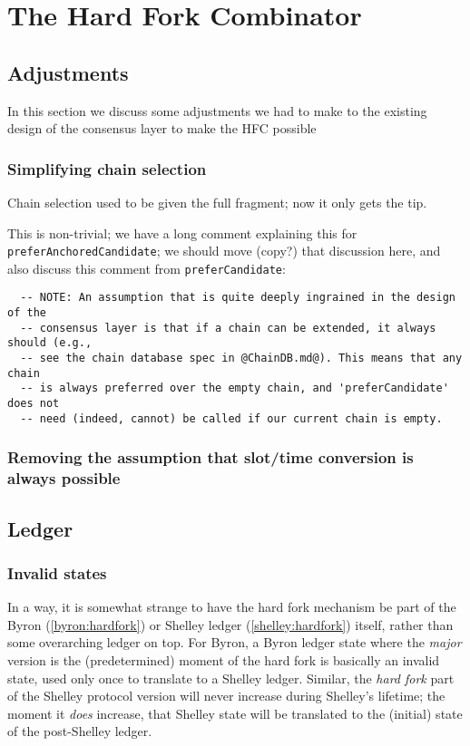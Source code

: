 \chapter{The Hard Fork Combinator}
\label{hfc}

\section{Adjustments}

In this section we discuss some adjustments we had to make to the existing
design of the consensus layer to make the HFC possible

\subsection{Simplifying chain selection}
\label{simplifying-chain-selection}

Chain selection used to be given the full fragment; now it only gets the tip.

This is non-trivial; we have a long comment explaining this for
\lstinline!preferAnchoredCandidate!; we should move (copy?) that discussion
here, and also discuss this comment from \lstinline!preferCandidate!:

\begin{lstlisting}
  -- NOTE: An assumption that is quite deeply ingrained in the design of the
  -- consensus layer is that if a chain can be extended, it always should (e.g.,
  -- see the chain database spec in @ChainDB.md@). This means that any chain
  -- is always preferred over the empty chain, and 'preferCandidate' does not
  -- need (indeed, cannot) be called if our current chain is empty.
\end{lstlisting}


\subsection{Removing the assumption that slot/time conversion is always possible}
\label{removing-known-slot-assumption}

\section{Ledger}

\subsection{Invalid states}

In a way, it is somewhat strange to have the hard fork mechanism be part of the
Byron (\cref{byron:hardfork}) or Shelley ledger (\cref{shelley:hardfork})
itself, rather than some overarching ledger on top. For Byron, a Byron ledger
state where the \emph{major} version is the (predetermined) moment of the hard
fork is basically an invalid state, used only once to translate to a Shelley
ledger. Similar, the \emph{hard fork} part of the Shelley protocol version will
never increase during Shelley's lifetime; the moment it \emph{does} increase,
that Shelley state will be translated to the (initial) state of the post-Shelley
ledger.
